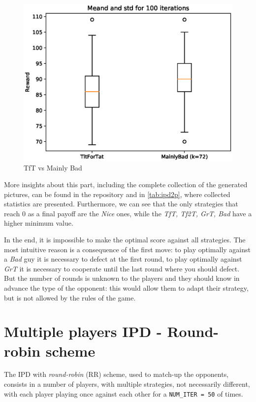 \documentclass[journal,a4paper,10pt,twoside]{IEEEtran} %
\begin{document}
\begin{figure}[!ht]
    \centering
    \includegraphics[width=1\columnwidth]{../img/ipd2p/ipd2p-boxplot-TitForTat-MainlyBad(k=72)}
    \caption{TfT vs Mainly Bad}
    \label{fig:boxmbvtft}
\end{figure}

More insights about this part, including the complete collection of the generated pictures, can be found in the repository and in \autoref{tab:ipd2p}, where collected statistics are presented. %
Furthermore, we can see that the only strategies that reach $0$ as a final payoff are the \textit{Nice} ones, while the \textit{TfT, Tf2T, GrT, Bad} have a higher minimum value.

In the end, it is impossible to make the optimal score against all strategies. The most intuitive reason is a consequence of the first move: to play optimally against a \textit{Bad} guy it is necessary to defect at the first round, to play optimally against \textit{GrT} it is necessary to cooperate until the last round where you should defect.~\cite{mathieu2017}
But the number of rounds is unknown to the players and they should know in advance the type of the opponent: this would allow them to adapt their strategy, but is not allowed by the rules of the game. 

\section{Multiple players IPD - Round-robin scheme} \label{s:IPDMP}
The IPD with \textit{round-robin} (RR) scheme, used to match-up the opponents, consists in a number of players, with multiple strategies, not necessarily different, with each player playing once against each other for a \texttt{NUM\_ITER = 50} of times.
\end{document}
